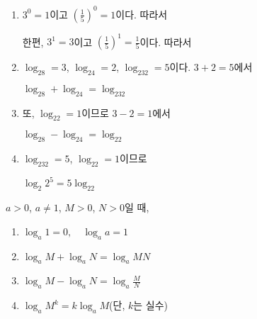\documentclass{oblivoir}
\begin{document}
%
\exam{}
\begin{enumerate}\label{prop1}
\item
\(3^0=1\)이고 \((\frac15)^0=1\)이다.
따라서
\begin{center}
\qquad
{}
\end{center}
한편, \(3^1=3\)이고 \((\frac15)^1=\frac15\)이다.
따라서
\begin{center}
\qquad
{}
\end{center}
\item
\(\log_28=3\), \(\log_24=2\), \(\log_232=5\)이다.
\(3+2=5\)에서
\begin{mdframed}[rightmargin=.2\textwidth,leftmargin=.2\textwidth]
\centering
\(\log_28+\log_24=\log_232\)
\end{mdframed}
\item
또, \(\log_22=1\)이므로 \(3-2=1\)에서
\begin{mdframed}[rightmargin=.2\textwidth,leftmargin=.2\textwidth]
\centering
\(\log_28-\log_24=\log_22\)
\end{mdframed}
\item
\(\log_232=5\), \(\log_22=1\)이므로
\begin{mdframed}[rightmargin=.2\textwidth,leftmargin=.2\textwidth]
\centering
\(\log_2{2^5}=5\log_22\)
\end{mdframed}
\end{enumerate}

\begin{mdframed}
%
\label{prop2}
\(a>0\), \(a\neq1\), \(M>0\), \(N>0\)일 때,
\begin{enumerate}[label=(\alph*)]
\item
\(\log_a1=0,\quad\log_aa=1\)
\item
\(\log_aM+\log_aN=\log_aMN\)
\item
\(\log_aM-\log_aN=\log_a{\frac MN}\)
\item
\(\log_a{M^k}=k\log_aM\)\quad(단, \(k\)는 실수)
\end{enumerate}
\end{mdframed}
\end{document}
